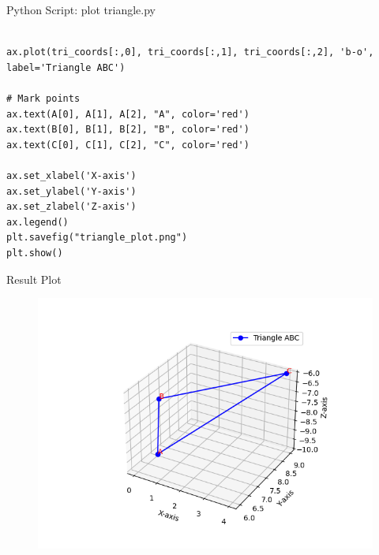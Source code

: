 \documentclass{beamer}
\numberwithin{equation}{section}
\theoremstyle{remark}
\begin{document}
\begin{frame}[fragile]{Python Script: plot triangle.py}
\begin{verbatim}

ax.plot(tri_coords[:,0], tri_coords[:,1], tri_coords[:,2], 'b-o', label='Triangle ABC')

# Mark points
ax.text(A[0], A[1], A[2], "A", color='red')
ax.text(B[0], B[1], B[2], "B", color='red')
ax.text(C[0], C[1], C[2], "C", color='red')

ax.set_xlabel('X-axis')
ax.set_ylabel('Y-axis')
ax.set_zlabel('Z-axis')
ax.legend()
plt.savefig("triangle_plot.png")
plt.show()

\end{verbatim}
\end{frame}

\begin{frame}{Result Plot}
 \begin{figure}[H]
     \centering
     \includegraphics[width=0.8\columnwidth]{figs/fig1.png}
     \caption*{}
     \label{fig:fig1}
 \end{figure}
  
\end{frame}
\end{document}
